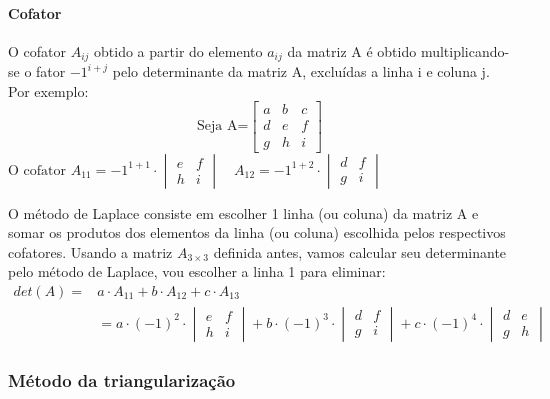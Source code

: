    \paragraph*{Cofator} \label{par:cof}O cofator $A_{ij}$ obtido a partir do elemento $a_{ij}$ da matriz A é obtido multiplicando-se o fator $-1^{i+j}$ pelo determinante da matriz A, excluídas a linha i e coluna j. Por exemplo:
\begin{displaymath}
    \text{Seja A=}\begin{bmatrix}
     a & b & c\\d & e & f\\g & h & i
   \end{bmatrix}
\end{displaymath}
   $\text{O cofator }A_{11}=-1^{1+1}\cdot \begin{vmatrix}
     e & f\\h & i
   \end{vmatrix}\quad A_{12}=-1^{1+2}\cdot \begin{vmatrix}
     d & f\\g & i
   \end{vmatrix}$
   
   O método de Laplace consiste em escolher 1 linha (ou coluna) da matriz A e somar os produtos dos elementos da linha (ou coluna) escolhida pelos respectivos cofatores. Usando a matriz $A_{3\times 3}$ definida antes, vamos calcular seu determinante pelo método de Laplace, vou escolher a linha 1 para eliminar:
   \begin{align*}
     det(A)=&a\cdot A_{11}+b\cdot A_{12}+c\cdot A_{13}\\
     &= a\cdot (-1)^2\cdot \begin{vmatrix} e & f\\h & i\end{vmatrix}+b\cdot(-1)^{3}\cdot
      \begin{vmatrix}d & f\\g & i\end{vmatrix}+  c\cdot (-1)^4\cdot \begin{vmatrix}d & e\\g & h\end{vmatrix}
   \end{align*}
   \subsubsection*{Método da triangularização}
	
